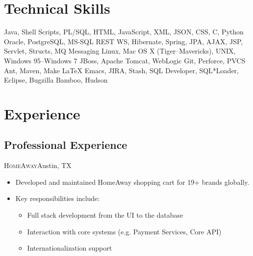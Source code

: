 \documentclass[11pt,letterpaper,sans]{moderncv}
\begin{document}
\section{Technical Skills}
         {Java, Shell Scripts, PL/SQL, HTML, JavaScript, XML, JSON, CSS, 
         C, Python}
         {Oracle, PostgreSQL, MS-SQL}
         {REST WS, Hibernate, Spring, JPA, AJAX, JSP, Servlet, Structs, 
         MQ Messaging}
         {Linux, Mac OS X (Tiger--Mavericks), UNIX, Windows 95--Windows 7}
         {JBoss, Apache Tomcat, WebLogic}
         {Git, Perforce, PVCS}
         {Ant, Maven, Make}
         {\LaTeX}
         {Emacs, JIRA, Stash, SQL Developer, SQL*Loader, Eclipse, Bugzilla}
         {Bamboo, Hudson}



\section{Experience}

  \subsection{Professional Experience}
     {\textsc{HomeAway}}{Austin, TX}{}
     {\begin{itemize}
         \item Developed and maintained HomeAway shopping cart for 19+
               brands globally.
         \item Key responsibilities include:
               {\begin{itemize}
                   \item Full stack development from the UI to the
                         database
                   \item Interaction with core systems (e.g. Payment
                         Services, Core API)
                   \item Internationalization support
                \end{itemize}}
     \end{itemize}}
\end{document}
